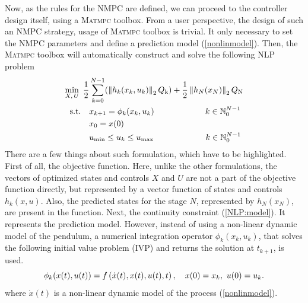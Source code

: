 Now, as the rules for the NMPC are defined, we can proceed to the controller design itself, using a \textsc{Matmpc} toolbox. From a user perspective, the design of such an NMPC strategy, usage of \textsc{Matmpc} toolbox is trivial. It only necessary to set the NMPC parameters and define a prediction model (\ref{nonlinmodel}). Then, the \textsc{Matmpc} toolbox will automatically construct and solve the following NLP problem
\begin{subequations}\label{NLP}
	\begin{align}
	\min_{X,\,U}\ \frac{1}{2}&\sum_{k=0}^{N-1} (\left\| h_k(x_k, u_k)\right\|_2Q _{\text{k}}) + \frac{1}{2}\left\|h_N(x_N)\right\|_2Q _{\text{N}}\label{NLP:obj}\\
	\text{s.t.}\quad &x_{k+1} = \phi_k(x_{k},u_{k})\qquad\qquad\qquad\, k \in \mathbb{N}_0^{N-1}\label{NLP:model}\\
	&x_0 = x(0)\\
	&u _{\text{min}}\leq u_{k}\leq u _{\text{max}}\qquad\qquad\qquad\;   k \in \mathbb{N}_0^{N-1}	
	\end{align}
\end{subequations}
There are a few things about such formulation, which have to be highlighted. First of all, the objective function. Here, unlike the other formulations, the vectors of optimized states and controls $X$ and $U$ are not a part of the objective function directly, but represented by a vector function of states and controls $h_k(x, u)$. Also, the predicted states for the stage $N$, represented by $h_N(x_N)$, are present in the function. Next, the continuity constraint (\ref{NLP:model}). It represents the prediction model. However, instead of using a non-linear dynamic model of the pendulum,  a numerical integration operator $\phi_k(x_{k},u_{k})$, that solves the following initial value problem (IVP) and returns the solution at $t_{k+1}$, is used. 
\begin{equation}
\phi_k(x(t),u(t))=f\left( \dot{x}(t), x(t),u(t),t \right),\quad x(0)=x_k,\ u(0)=u_k.
\end{equation}
where $\dot{x}(t)$ is a non-linear dynamic model of the process (\ref{nonlinmodel}).

